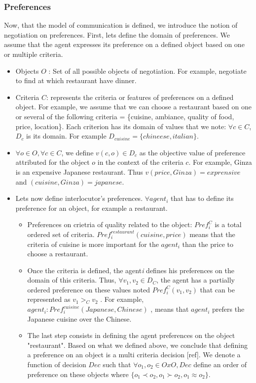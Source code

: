 \documentclass{llncs}
\begin{document}
\subsubsection{Preferences}
\par Now, that  the model of communication is defined, we introduce the notion of negotiation on preferences. First, lets define the domain of preferences. We assume that the agent expresses its preference on a defined object based on one or multiple criteria.   
 \begin{itemize}
 \item Objects $O$ : Set of all possible objects of negotiation. For example, negotiate to find at which restaurant have dinner.
 \item Criteria $C$: represents the criteria or features of preferences on a defined object. For example, we assume that we can choose a restaurant based on one or several of the following criteria = \{cuisine, ambiance, quality of food, price, location\}. Each criterion has its domain of values that we note: $\forall c \in C$, $D_{c}$ is its domain. For example $D_{cuisine} = \{chineese, italian\}$.

 \item $\forall o \in O, \forall c \in C$, we define $v(c,o) \in D_{c}$ as the objective value of preference attributed for the object $o$ in the context of the criteria $c$. For example, Ginza is an expensive Japanese restaurant. Thus $v(price, Ginza) = exprensive$ and $(cuisine, Ginza) = japanese$. 
 
 \item Lets now define interlocutor's preferences. $\forall agent_{i}$ that has to define its preference for an object, for example a restaurant.
 \begin{itemize}
 \item Preferences on crietria of quality related to the object: $Pref_{i}^C $ is a total ordered set of criteria.   $ Pref_{i}^{restaurant} (cuisine,price)$ means that the criteria of cuisine is more important for the $agent_{i}$  than the price to choose a restaurant.
 \item Once the criteria is defined, the agent\emph{i} defines his preferences on the domain of this criteria. Thus, $\forall v_{1} , v_{2} \in D_{C}$, the agent has a  partially ordered preference on these values noted $Pref_{i}^C (v_{1}, v_{2})$  that can be represented as $v_{1}>_{C} v_{2}$ . For example, $agent_{i}:  Pref_{i}^{cuisine} (Japanese , Chinese)$ , means that  $agent_{i}$ prefers the Japanese cuisine over the Chinese.
 \item The last step consists in defining the agent preferences on the object "restaurant". Based on what we defined above, we conclude that defining a preference on an object is a multi criteria decision [ref]. We denote a function of decision  $Dec$ such that $\forall o_{1}, o_{2} \in O x O, Dec$ define an order of preference on these objects where  $\{o_{1}\prec o_{2}, o_{1} \succ o_{2}, o_{1} \approx o_{2}\}$.
 \end{itemize} 
 \end{itemize}
\end{document}
